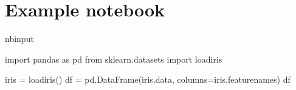 \documentclass[letterpaper,10pt,dvipdfmx]{sphinxmanual}
\begin{document}
\section{Example notebook}
\label{\detokenize{notebooks/sample:Example-notebook}}\label{\detokenize{notebooks/sample::doc}}
\begin{sphinxuseclass}{nbinput}
{
\begin{sphinxVerbatim}[commandchars=\\\{\}]
\llap{\color{nbsphinxin}[2]:\,\hspace{\fboxrule}\hspace{\fboxsep}}import pandas as pd
from sklearn.datasets import load\PYGZus{}iris

iris = load\PYGZus{}iris()
df = pd.DataFrame(iris.data, columns=iris.feature\PYGZus{}names)
df
\end{sphinxVerbatim}
}

\end{sphinxuseclass}
\end{document}

